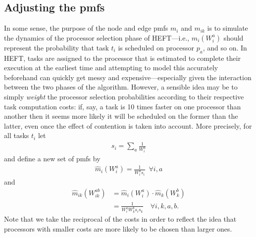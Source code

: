 \documentclass[12pt]{article}
\begin{document}




\subsection{Adjusting the pmfs}
\label{subsect.adjusting}

In some sense, the purpose of the node and edge pmfs $m_i$ and $m_{ik}$ is to simulate the dynamics of the processor selection phase of HEFT---i.e., $m_i(W_i^a)$ should represent the probability that task $t_i$ is scheduled on processor $p_a$, and so on. In HEFT, tasks are assigned to the processor that is estimated to complete their execution at the earliest time and attempting to model this accurately beforehand can quickly get messy and expensive---especially given the interaction between the two phases of the algorithm. However, a sensible idea may be to simply {\em weight} the processor selection probabilities according to their respective task computation costs: if, say, a task is 10 times faster on one processor than another then it seems more likely it will be scheduled on the former than the latter, even once the effect of contention is taken into account. More precisely, for all tasks $t_i$ let 
\begin{align*}
s_i = \sum_{a} \frac{1}{W_i^a}
\end{align*} 
and define a new set of pmfs by
\begin{align*}
\hat{m}_i(W_i^a) = \frac{1}{W_i^as_i} \enspace \forall i, a
\end{align*}
and 
\begin{align*}
\hat{m}_{ik}(W_{ik}^{ab}) &= \hat{m}_i(W_i^a) \cdot \hat{m}_k(W_k^b) \\
&= \frac{1}{W_i^aW_k^bs_is_k} \quad \forall i, k, a, b.
\end{align*}
Note that we take the reciprocal of the costs in order to reflect the idea that processors with smaller costs are more likely to be chosen than larger ones.
\end{document}
